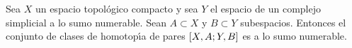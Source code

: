 \begin{coroCodominioNumerableHomotopicasNumerables}%
	\label{thm:codominionumerablehomotpicasnumerables}
	Sea $X$ un espacio topol\'{o}gico compacto y sea $Y$ el espacio de
	un complejo simplicial a lo sumo numerable. Sean $A\subset X$ y
	$B\subset Y$ subespacios. Entonces el conjunto de clases de
	homotop\'{\i}a de pares $\left[X,A;Y,B\right]_{}$ es a lo sumo
	numerable.
\end{coroCodominioNumerableHomotopicasNumerables}

